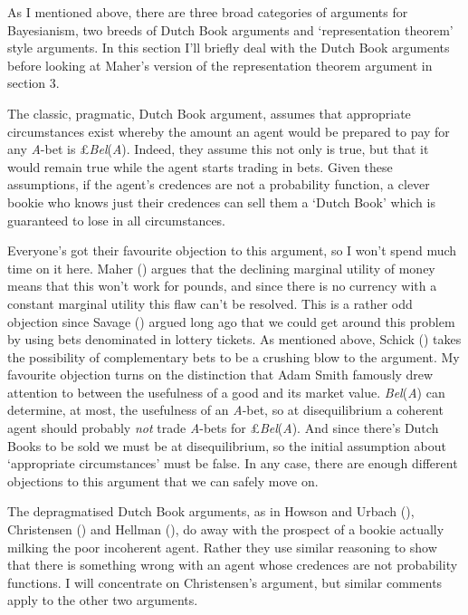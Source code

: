 \documentclass[
  10pt,
  letterpaper,
  DIV=11,
  numbers=noendperiod,
  twoside]{scrartcl}
\begin{document}
As I mentioned above, there are three broad categories of arguments for
Bayesianism, two breeds of Dutch Book arguments and `representation
theorem' style arguments. In this section I'll briefly deal with the
Dutch Book arguments before looking at Maher's version of the
representation theorem argument in section 3.

The classic, pragmatic, Dutch Book argument, assumes that appropriate
circumstances exist whereby the amount an agent would be prepared to pay
for any \emph{A}-bet is £\emph{Bel}(\emph{A}). Indeed, they assume this
not only is true, but that it would remain true while the agent starts
trading in bets. Given these assumptions, if the agent's credences are
not a probability function, a clever bookie who knows just their
credences can sell them a `Dutch Book' which is guaranteed to lose in
all circumstances.

Everyone's got their favourite objection to this argument, so I won't
spend much time on it here. Maher ()
argues that the declining marginal utility of money means that this
won't work for pounds, and since there is no currency with a constant
marginal utility this flaw can't be resolved. This is a rather odd
objection since Savage () argued long ago
that we could get around this problem by using bets denominated in
lottery tickets. As mentioned above, Schick
() takes the possibility of complementary
bets to be a crushing blow to the argument. My favourite objection turns
on the distinction that Adam Smith famously drew attention to between
the usefulness of a good and its market value. \emph{Bel}(\emph{A}) can
determine, at most, the usefulness of an \emph{A}-bet, so at
disequilibrium a coherent agent should probably \emph{not} trade
\emph{A}-bets for £\emph{Bel}(\emph{A}). And since there's Dutch Books
to be sold we must be at disequilibrium, so the initial assumption about
`appropriate circumstances' must be false. In any case, there are enough
different objections to this argument that we can safely move on.

The depragmatised Dutch Book arguments, as in Howson and Urbach
(), Christensen
() and Hellman
(), do away with the prospect of a
bookie actually milking the poor incoherent agent. Rather they use
similar reasoning to show that there is something wrong with an agent
whose credences are not probability functions. I will concentrate on
Christensen's argument, but similar comments apply to the other two
arguments.
\end{document}
